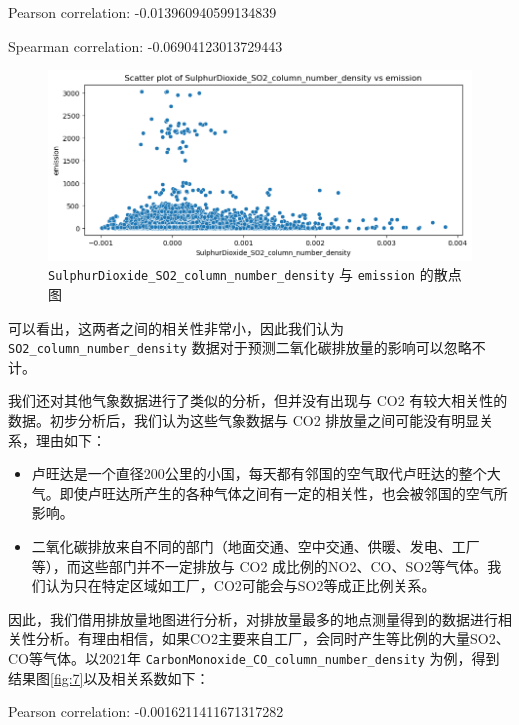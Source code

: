 \documentclass{ctexart}
\begin{document}
\begin{sloppypar}
\begin{center}
      Pearson correlation: -0.013960940599134839

      Spearman correlation: -0.06904123013729443
\end{center}


\begin{figure}[H]
      \centering
      \includegraphics[width=1\textwidth]{output1.png}
      \caption{\texttt{SulphurDioxide\_SO2\_column\_number\_density} 与 \texttt{emission} 的散点图}
      \label{fig:1}
\end{figure}

可以看出，这两者之间的相关性非常小，因此我们认为 \texttt{SO2\_column\_number\_density} 数据对于预测二氧化碳排放量的影响可以忽略不计。

我们还对其他气象数据进行了类似的分析，但并没有出现与 CO2 有较大相关性的数据。初步分析后，我们认为这些气象数据与 CO2 排放量之间可能没有明显关系，理由如下：

\begin{itemize}
      \item 卢旺达是一个直径200公里的小国，每天都有邻国的空气取代卢旺达的整个大气。即使卢旺达所产生的各种气体之间有一定的相关性，也会被邻国的空气所影响。
      \item 二氧化碳排放来自不同的部门（地面交通、空中交通、供暖、发电、工厂等），而这些部门并不一定排放与 CO2 成比例的NO2、CO、SO2等气体。我们认为只在特定区域如工厂，CO2可能会与SO2等成正比例关系。
\end{itemize}

因此，我们借用排放量地图进行分析，对排放量最多的地点测量得到的数据进行相关性分析。有理由相信，如果CO2主要来自工厂，会同时产生等比例的大量SO2、CO等气体。以2021年 \texttt{CarbonMonoxide\_CO\_column\_number\_density} 为例，得到结果图\ref{fig:7}以及相关系数如下：

\begin{center}
      Pearson correlation: -0.0016211411671317282


\end{center}
\end{sloppypar}
\end{document}
